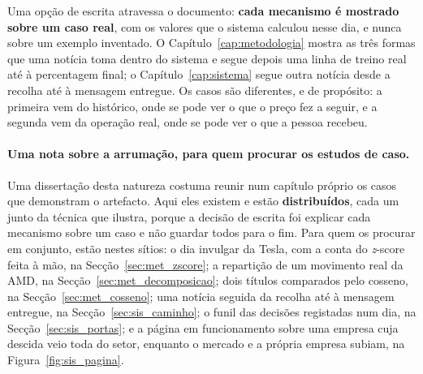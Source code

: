 Uma opção de escrita atravessa o documento: \textbf{cada mecanismo é mostrado sobre um caso real},
com os valores que o sistema calculou nesse dia, e nunca sobre um exemplo inventado. O
Capítulo~\ref{cap:metodologia} mostra as três formas que uma notícia toma dentro do sistema e
segue depois uma linha de treino real até à percentagem final; o Capítulo~\ref{cap:sistema} segue
outra notícia desde a recolha até à mensagem entregue. Os casos são diferentes, e de propósito: a primeira vem do histórico, onde se pode ver o que o preço
fez a seguir, e a segunda vem da operação real, onde se pode ver o que a pessoa recebeu.

\paragraph{Uma nota sobre a arrumação, para quem procurar os estudos de caso.} Uma dissertação
desta natureza costuma reunir num capítulo próprio os casos que demonstram o artefacto. Aqui eles
existem e estão \textbf{distribuídos}, cada um junto da técnica que ilustra, porque a decisão de
escrita foi explicar cada mecanismo sobre um caso e não guardar todos para o fim. Para quem os
procurar em conjunto, estão nestes sítios: o dia invulgar da Tesla, com a conta do
\emph{z}-score feita à mão, na Secção~\ref{sec:met_zscore}; a repartição de um movimento real da
AMD, na Secção~\ref{sec:met_decomposicao}; dois títulos comparados pelo cosseno, na
Secção~\ref{sec:met_cosseno}; uma notícia seguida da recolha até à mensagem entregue, na
Secção~\ref{sec:sis_caminho}; o funil das decisões registadas num dia, na
Secção~\ref{sec:sis_portas}; e a página em funcionamento sobre uma empresa cuja descida veio
toda do setor, enquanto o mercado e a própria empresa subiam, na Figura~\ref{fig:sis_pagina}.
